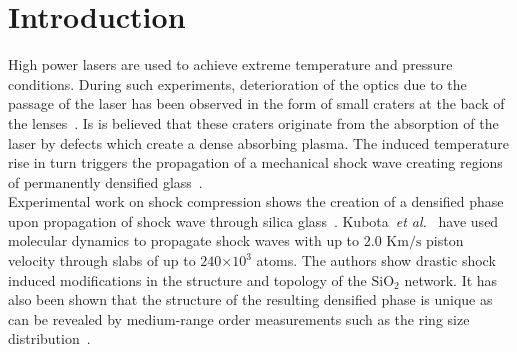 \documentclass[aps,10pt,twocolumn]{revtex4}
\makeatletter
\newcommand{\etal}{\emph{et al.}\@\xspace}
\newcommand{\mrm}[1]{\ensuremath{\mathrm{#1}}\xspace}
\newcommand{\SiOTwo}{\ensuremath{\mrm{SiO_2}}\xspace}
\newcommand{\e}[1]{\ensuremath{\times 10^{#1}}}
\makeatother
\begin{document}
\maketitle

\section{Introduction}


High power lasers are used to achieve extreme temperature and pressure conditions. During such
experiments, deterioration of the optics due to the passage of the laser has been observed in
the form of small craters at the back of the lenses~\cite{FeitCampbell97,FeitHrubesh00}. Is is
believed that these craters originate from the absorption of the laser by defects which create a
dense absorbing plasma.  The induced temperature rise in turn triggers the propagation of a
mechanical shock wave creating regions of permanently densified glass~\cite{DemosKoslowski00}.\\
Experimental work on shock compression shows the creation of a densified
phase upon propagation of shock wave through silica glass~\cite{SugiuraIkeda96}.
Kubota~\etal~\cite{KubotaCaturla01,KubotaCaturla03} have used molecular 
dynamics to propagate shock waves with up to $2.0$ \mrm{Km/s} piston velocity through slabs
of up to $240\e{3}$ atoms. The authors show drastic shock induced modifications in the structure
and topology of the \SiOTwo network. It has also been shown that the structure of the resulting
densified phase is unique as can be revealed by medium-range order measurements such as the ring
size distribution~\cite{SusmanVolin91,TrachenkoDove02,DavilaCaturla03}.\\ 
\end{document}
